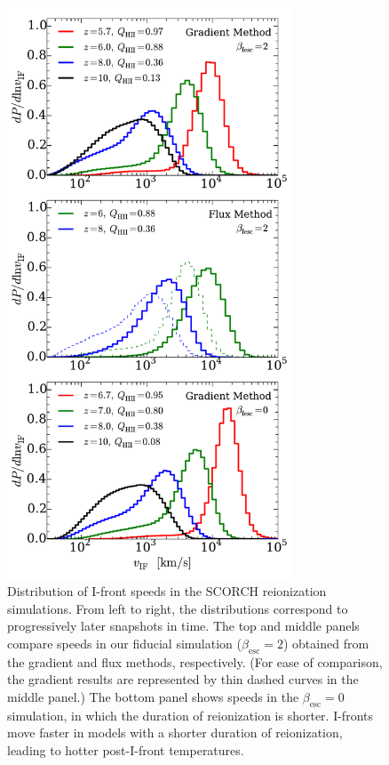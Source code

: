 \documentclass[twocolumn]{aastex62}
\begin{document}
\begin{figure}
\includegraphics[width=8.5cm]{fig7.pdf}
\caption{Distribution of I-front speeds in the SCORCH reionization simulations.  From left to right, the distributions correspond to progressively later snapshots in time. The top and middle panels compare speeds in our fiducial simulation ($\beta_{\mathrm{esc}} = 2$) obtained from the gradient and flux methods, respectively. (For ease of comparison, the gradient results are represented by thin dashed curves in the middle panel.)  The bottom panel shows speeds in the $\beta_{\mathrm{esc}} = 0$ simulation, in which the duration of reionization is shorter.  I-fronts move faster in models with a shorter duration of reionization, leading to hotter post-I-front temperatures.     }
\label{fig:vIFdists}
\end{figure}
\end{document}
